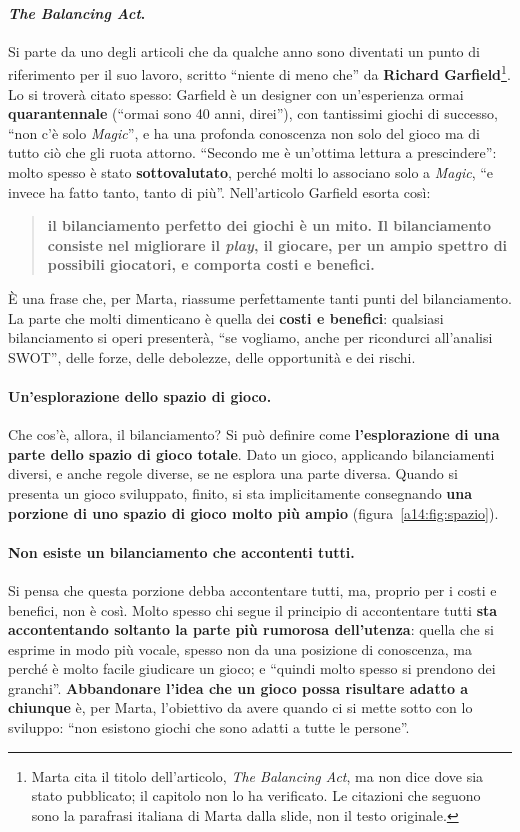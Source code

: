 \paragraph{\emph{The Balancing Act}.} Si parte da uno degli articoli che da qualche anno sono
diventati un punto di riferimento per il suo lavoro, scritto ``niente di meno che'' da
\textbf{Richard Garfield}\footnote{Marta cita il titolo dell'articolo, \emph{The Balancing
Act}, ma non dice dove sia stato pubblicato; il capitolo non lo ha verificato. Le citazioni
che seguono sono la parafrasi italiana di Marta dalla slide, non il testo originale.}. Lo si
troverà citato spesso: Garfield è un designer con un'esperienza ormai
\textbf{quarantennale} (``ormai sono 40 anni, direi''), con tantissimi giochi di successo,
``non c'è solo \emph{Magic}'', e ha una profonda conoscenza non solo del gioco ma di tutto
ciò che gli ruota attorno. ``Secondo me è un'ottima lettura a prescindere'': molto spesso è
stato \textbf{sottovalutato}, perché molti lo associano solo a \emph{Magic}, ``e invece ha
fatto tanto, tanto di più''. Nell'articolo Garfield esorta così:
\begin{quote}
\textbf{il bilanciamento perfetto dei giochi è un mito. Il bilanciamento consiste nel
migliorare il \emph{play}, il giocare, per un ampio spettro di possibili giocatori, e
comporta costi e benefici.}
\end{quote}
È una frase che, per Marta, riassume perfettamente tanti punti del bilanciamento. La parte che
molti dimenticano è quella dei \textbf{costi e benefici}: qualsiasi bilanciamento si operi
presenterà, ``se vogliamo, anche per ricondurci all'analisi SWOT'', delle forze, delle
debolezze, delle opportunità e dei rischi.

\paragraph{Un'esplorazione dello spazio di gioco.} Che cos'è, allora, il bilanciamento? Si
può definire come \textbf{l'esplorazione di una parte dello spazio di gioco totale}. Dato un
gioco, applicando bilanciamenti diversi, e anche regole diverse, se ne esplora una parte
diversa. Quando si presenta un gioco sviluppato, finito, si sta implicitamente consegnando
\textbf{una porzione di uno spazio di gioco molto più ampio} (figura~\ref{a14:fig:spazio}).

\paragraph{Non esiste un bilanciamento che accontenti tutti.} Si pensa che questa porzione
debba accontentare tutti, ma, proprio per i costi e benefici, non è così. Molto spesso chi
segue il principio di accontentare tutti \textbf{sta accontentando soltanto la parte più
rumorosa dell'utenza}: quella che si esprime in modo più vocale, spesso non da una posizione
di conoscenza, ma perché è molto facile giudicare un gioco; e ``quindi molto spesso si
prendono dei granchi''. \textbf{Abbandonare l'idea che un gioco possa risultare adatto a
chiunque} è, per Marta, l'obiettivo da avere quando ci si mette sotto con lo sviluppo: ``non
esistono giochi che sono adatti a tutte le persone''.

